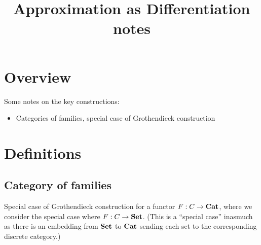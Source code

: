 \documentclass{acmart}
\begin{document}
\title{Approximation as Differentiation notes}
\maketitle

\section{Overview}

Some notes on the key constructions:
\begin{itemize}
\item Categories of families, special case of Grothendieck construction
\end{itemize}

\section{Definitions}

\subsection{Category of families}

Special case of Grothendieck construction for a functor $F: C \to \mathbf{Cat}$, where we consider the special case
where $F: C \to \mathbf{Set}$. (This is a ``special case'' inasmuch as there is an embedding from $\mathbf{Set}$ to $\mathbf{Cat}$
sending each set to the corresponding discrete category.)
\end{document}
